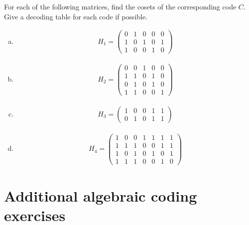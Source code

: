 \begin{exercise}{}
For each of the following matrices, find the cosets of the
corresponding code $C$. Give a decoding table for each code if
possible. 
 
\begin{enumerate}[(a)]
\item
\begin{align*}
H_1 = \left(
\begin{array}{ccccc}
0 & 1 & 0 & 0 & 0 \\
1 & 0 & 1 & 0 & 1 \\
1 & 0 & 0 & 1 & 0
\end{array}
\right)
\end{align*} 

\item
\begin{align*}
H_2 = \left(
\begin{array}{ccccc}
0 & 0 & 1 & 0 & 0  \\
1 & 1 & 0 & 1 & 0 \\
0 & 1 & 0 & 1 & 0 \\
1 & 1 & 0 & 0 & 1
\end{array}
\right)
\end{align*} 

 \item
\begin{align*}
H_3 = \left(
\begin{array}{ccccc}
1 & 0 & 0 & 1 & 1 \\
0 & 1 & 0 & 1 & 1
\end{array}
\right)
\end{align*} 


 \item
\begin{align*}
H_4 = \left(
\begin{array}{ccccccc}
1 & 0 & 0 & 1 & 1 & 1 & 1 \\
1 & 1 & 1 & 0 & 0 & 1 & 1 \\
1 & 0 & 1 & 0 & 1 & 0 & 1 \\
1 & 1 & 1 & 0 & 0 & 1 & 0
\end{array}
\right)
\end{align*} 


\end{enumerate}
 
\end{exercise}
 

\section{Additional algebraic coding exercises}\label{AlgCodeEx}
 

